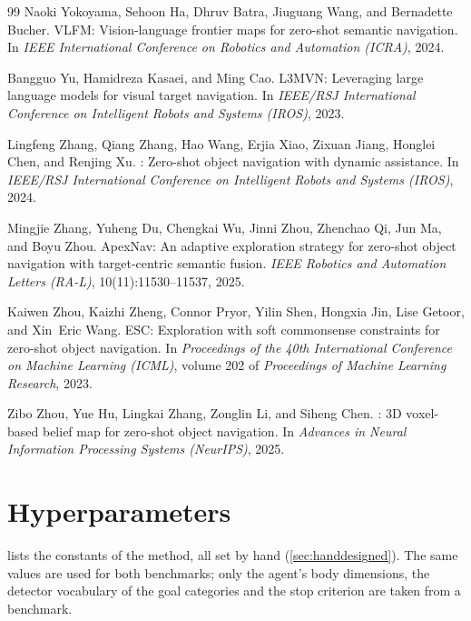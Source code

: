 \documentclass[10pt]{article}
\begin{document}
\begin{thebibliography}{99}
Naoki Yokoyama, Sehoon Ha, Dhruv Batra, Jiuguang Wang, and Bernadette Bucher.
\newblock VLFM: Vision-language frontier maps for zero-shot semantic navigation.
\newblock In \emph{IEEE International Conference on Robotics and Automation (ICRA)}, 2024.

Bangguo Yu, Hamidreza Kasaei, and Ming Cao.
\newblock L3MVN: Leveraging large language models for visual target navigation.
\newblock In \emph{IEEE/RSJ International Conference on Intelligent Robots and Systems (IROS)}, 2023.

Lingfeng Zhang, Qiang Zhang, Hao Wang, Erjia Xiao, Zixuan Jiang, Honglei Chen, and Renjing Xu.
: Zero-shot object navigation with dynamic assistance.
\newblock In \emph{IEEE/RSJ International Conference on Intelligent Robots and Systems (IROS)}, 2024.

Mingjie Zhang, Yuheng Du, Chengkai Wu, Jinni Zhou, Zhenchao Qi, Jun Ma, and Boyu Zhou.
\newblock ApexNav: An adaptive exploration strategy for zero-shot object navigation with target-centric semantic fusion.
\newblock \emph{IEEE Robotics and Automation Letters (RA-L)}, 10(11):11530--11537, 2025.

Kaiwen Zhou, Kaizhi Zheng, Connor Pryor, Yilin Shen, Hongxia Jin, Lise Getoor, and Xin~Eric Wang.
\newblock ESC: Exploration with soft commonsense constraints for zero-shot object navigation.
\newblock In \emph{Proceedings of the 40th International Conference on Machine Learning (ICML)}, volume 202 of \emph{Proceedings of Machine Learning Research}, 2023.

Zibo Zhou, Yue Hu, Lingkai Zhang, Zonglin Li, and Siheng Chen.
: {3D} voxel-based belief map for zero-shot object navigation.
\newblock In \emph{Advances in Neural Information Processing Systems (NeurIPS)}, 2025.

\end{thebibliography}

\appendix
{}

\section{Hyperparameters}\label{app:hyperparams}
 lists the constants of the method, all set by hand
(\cref{sec:handdesigned}). The same values are used for both benchmarks; only
the agent's body dimensions, the detector vocabulary of the goal categories
and the stop criterion are taken from a benchmark.
\end{document}
